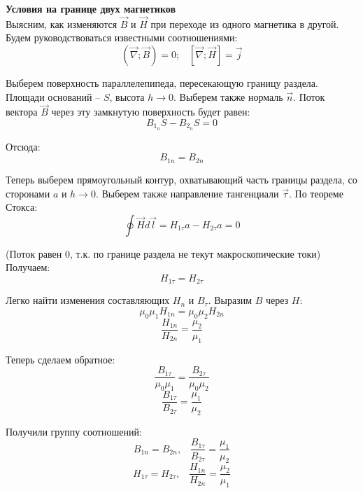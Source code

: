 \documentclass{article}
\begin{document}
	
	\textbf{Условия на границе двух магнетиков}\\

	Выясним, как изменяются $\vec B$ и $\vec H$ при переходе из одного магнетика в другой. Будем руководствоваться известными соотношениями:
	\begin{equation}
		(\vec\nabla;\vec B) = 0; \;\;\; [\vec\nabla;\vec H] = \vec j
	\end{equation}

	Выберем поверхность параллелепипеда, пересекающую границу раздела. Площади оснований -- $S$, высота $h\rightarrow 0$. Выберем также нормаль $\vec n$. Поток вектора $\vec B$ через эту замкнутую поверхность будет равен: 
	\begin{equation}
		B_{1_n}S - B_{2_n}S = 0
	\end{equation}

	Отсюда:
	\begin{equation}
		B_{1n} = B_{2n}
	\end{equation}

	Теперь выберем прямоугольный контур, охватывающий часть границы раздела, со сторонами $a$ и $h\rightarrow 0$. Выберем также направление тангенциали $\vec\tau$. По теореме Стокса:
	\begin{equation}
		\oint \vec H d\vec l = H_{1\tau}a - H_{2\tau}a = 0
	\end{equation}

	(Поток равен $0$, т.к. по границе раздела не текут макроскопические токи)\\

	Получаем:
	\begin{equation}
		H_{1\tau} = H_{2\tau}
	\end{equation}

	Легко найти изменения составляющих $H_n$ и $B_\tau$. Выразим $B$ через $H$:
	\begin{equation}
		\mu_0\mu_1 H_{1n} = \mu_0\mu_2 H_{2n}
	\end{equation}
	\begin{equation}
		\frac{H_{1n}}{H_{2n}} = \frac{\mu_2}{\mu_1}
	\end{equation}

	Теперь сделаем обратное:
	\begin{equation}
		\frac{B_{1\tau}}{\mu_0\mu_1} = \frac{B_{2\tau}}{\mu_0\mu_2}
	\end{equation}
	\begin{equation}
		\frac{B_{1\tau}}{B_{2\tau}} = \frac{\mu_1}{\mu_2}
	\end{equation}

	Получили группу соотношений:
	\begin{equation}
		B_{1n} = B_{2n}, \;\;\; \frac{B_{1\tau}}{B_{2\tau}} = \frac{\mu_1}{\mu_2}
	\end{equation}
	\begin{equation}
		H_{1\tau} = H_{2\tau}, \;\;\; \frac{H_{1n}}{H_{2n}} = \frac{\mu_2}{\mu_1}
	\end{equation}
\end{document}
